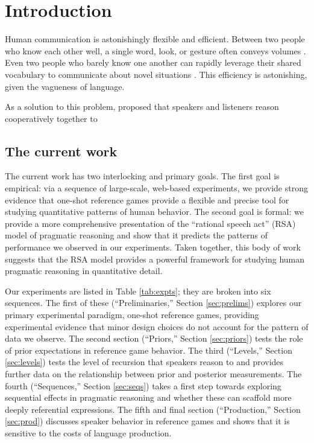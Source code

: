 \section{Introduction}

Human communication is astonishingly flexible and efficient. Between two people who know each other well, a single word, look, or gesture often conveys volumes \cite{grice1975,sperber1986,clark1996}. Even two people who barely know one another can rapidly leverage their shared vocabulary to communicate about novel situations \cite{brennan1993}.  This efficiency is astonishing, given the vagueness of language. 

As a solution to this problem,  proposed that speakers and listeners reason cooperatively together to 


\subsection{The current work}

The current work has two interlocking and primary goals. The first goal is empirical: via a sequence of large-scale, web-based experiments, we provide strong evidence that one-shot reference games provide a flexible and precise tool for studying quantitative patterns of human behavior. The second goal is formal: we provide a more comprehensive presentation of the ``rational speech act'' (RSA) model of pragmatic reasoning and show that it predicts the patterns of performance we observed in our experiments. Taken together, this body of work suggests that the RSA model provides a powerful framework for studying human pragmatic reasoning in quantitative detail. 

Our experiments are listed in Table \ref{tab:expts}; they are broken into six sequences. The first of these (``Preliminaries,'' Section \ref{sec:prelims}) explores our primary experimental paradigm, one-shot reference games, providing experimental evidence that minor design choices do not account for the pattern of data we observe. The second section (``Priors,'' Section \ref{sec:priors}) tests the role of prior expectations in reference game behavior. The third (``Levels,'' Section \ref{sec:levels}) tests the level of recursion that speakers reason to and provides further data on the relationship between prior and posterior measurements. The fourth (``Sequences,'' Section \ref{sec:seqs}) takes a first step towards exploring sequential effects in pragmatic reasoning and whether these can scaffold more deeply referential expressions. The fifth and final section (``Production,'' Section \ref{sec:prod}) discusses speaker behavior in reference games and shows that it is sensitive to the costs of language production. 

